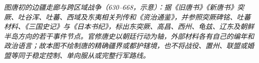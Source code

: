 \begin{center}

\smallskip
\small\textit{图\quad 唐初的边疆走廊与跨区域战争（630--668，示意）：据《旧唐书》《新唐书》突厥、吐谷浑、吐蕃、西域及东夷相关列传和《资治通鉴》，并参照突厥碑铭、吐蕃材料、《三国史记》与《日本书纪》，标出东突厥、高昌、西州、龟兹、辽东及朝鲜半岛方向的若干事件节点。官修唐史以朝廷行动为轴，外部材料各有自己的编年和政治语言；故本图不绘制唐的精确疆界或都护辖境，也不将战役、置州、联盟或婚盟等同于稳定控制、单向服从或完整行军路线。}
\end{center}
